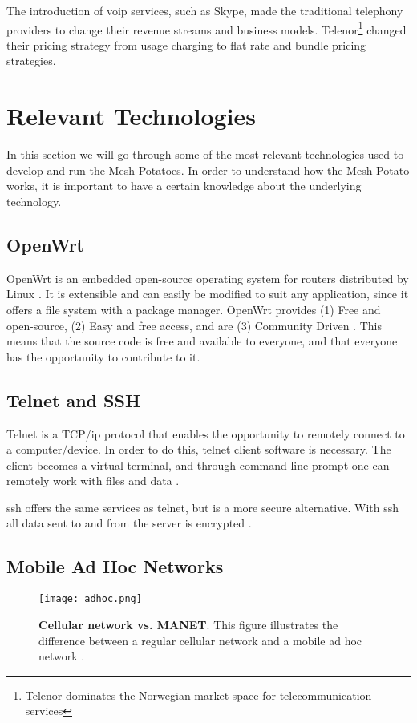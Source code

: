The introduction of \gls{voip} services, such as Skype, made the traditional telephony providers to change their revenue streams and business models. Telenor\footnote{Telenor dominates the Norwegian market space for telecommunication services} changed their pricing strategy from usage charging to flat rate and bundle pricing strategies. 


\section{Relevant Technologies}
In this section we will go through some of the most relevant technologies used to develop and run the Mesh Potatoes. In order to understand how the Mesh Potato works, it is important to have a certain knowledge about the underlying technology. 

\subsection{OpenWrt}
\label{subsec:openwrt}
OpenWrt is an embedded open-source operating system for routers distributed by Linux \cite{openwrt}. It is extensible and can easily be modified to suit any application, since it offers a file system with a package manager. OpenWrt provides (1) Free and open-source, (2) Easy and free access, and are (3) Community Driven \cite{openwrt}. This means that the source code is free and available to everyone, and that everyone has the opportunity to contribute to it. 

\subsection{Telnet and SSH}

Telnet is a TCP/\gls{ip} protocol that enables the opportunity to remotely connect to a computer/device. In order to do this, telnet client software is necessary. The client becomes a virtual terminal, and through command line prompt one can remotely work with files and data \cite{telnet}. 

\gls{ssh} offers the same services as telnet, but is a more secure alternative. With \gls{ssh} all data sent to and from the server is encrypted \cite{SSH}. 


\subsection{Mobile Ad Hoc Networks}

\begin{figure}[b]
  \centering
    \texttt{[image: adhoc.png]}
     \caption [Cellular network vs. MANET]{\textbf{Cellular network vs. MANET}. This figure illustrates the difference between a regular cellular network and a mobile ad hoc network \cite{adhoc2}.}
\label{fig:adhoc}
\end{figure}

